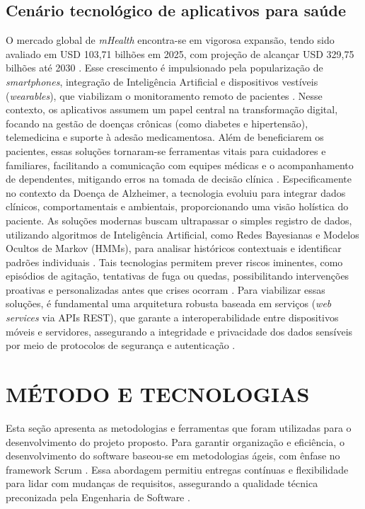 \documentclass[conference,a4paper,10pt]{IEEETran}
\begin{document}
\subsection{Cenário tecnológico de aplicativos para saúde}
O mercado global de \textit{mHealth} encontra-se em vigorosa expansão, tendo sido avaliado em USD 103,71 bilhões em 2025, com projeção de alcançar USD 329,75 bilhões até 2030 \cite{mordor_mhealth_2025}. Esse crescimento é impulsionado pela popularização de \textit{smartphones}, integração de Inteligência Artificial e dispositivos vestíveis (\textit{wearables}), que viabilizam o monitoramento remoto de pacientes \cite{lv_iCare, carvalho_Clinical}. Nesse contexto, os aplicativos assumem um papel central na transformação digital, focando na gestão de doenças crônicas (como diabetes e hipertensão), telemedicina e suporte à adesão medicamentosa. Além de beneficiarem os pacientes, essas soluções tornaram-se ferramentas vitais para cuidadores e familiares, facilitando a comunicação com equipes médicas e o acompanhamento de dependentes, mitigando erros na tomada de decisão clínica \cite{brainInventor_ReactNative, ChiarandiniWandering}.
Especificamente no contexto da Doença de Alzheimer, a tecnologia evoluiu para integrar dados clínicos, comportamentais e ambientais, proporcionando uma visão holística do paciente. As soluções modernas buscam ultrapassar o simples registro de dados, utilizando algoritmos de Inteligência Artificial, como Redes Bayesianas e Modelos Ocultos de Markov (HMMs), para analisar históricos contextuais e identificar padrões individuais \cite{QiuPredictiveModeling, Sukkar2012Disease}. Tais tecnologias permitem prever riscos iminentes, como episódios de agitação, tentativas de fuga ou quedas, possibilitando intervenções proativas e personalizadas antes que crises ocorram \cite{ChiarandiniWandering}. Para viabilizar essas soluções, é fundamental uma arquitetura robusta baseada em serviços (\textit{web services} via APIs REST), que garante a interoperabilidade entre dispositivos móveis e servidores, assegurando a integridade e privacidade dos dados sensíveis por meio de protocolos de segurança e autenticação \cite{carvalho_Clinical}.


\section{MÉTODO E TECNOLOGIAS}
Esta seção apresenta as metodologias e ferramentas que foram utilizadas para o desenvolvimento do projeto proposto. 
Para garantir organização e eficiência, o desenvolvimento do software baseou-se em metodologias ágeis, com ênfase no framework Scrum \cite{Schwaber2020ScrumGuide}. Essa abordagem permitiu entregas contínuas e flexibilidade para lidar com mudanças de requisitos, assegurando a qualidade técnica preconizada pela Engenharia de Software \cite{Pressman2016Software, Sommerville2011Software}.
\end{document}
